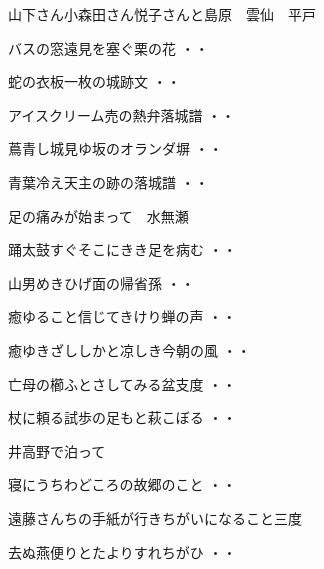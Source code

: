 山下さん小森田さん悦子さんと島原　雲仙　平戸
\begin{shiika}バスの窓遠見を塞ぐ栗の花
\hfill{・・}\end{shiika}
\begin{shiika}蛇の衣板一枚の城跡文
\hfill{・・}\end{shiika}
\begin{shiika}アイスクリーム売の熱弁落城譜
\hfill{・・}\end{shiika}
\begin{shiika}蔦青し城見ゆ坂のオランダ塀
\hfill{・・}\end{shiika}
\begin{shiika}青葉冷え天主の跡の落城譜
\hfill{・・}\end{shiika}
\vspace{ 0.4cm}
足の痛みが始まって　水無瀬
\begin{shiika}踊太鼓すぐそこにきき足を病む
\hfill{・・}\end{shiika}
\begin{shiika}山男めきひげ面の帰省孫
\hfill{・・}\end{shiika}
\begin{shiika}癒ゆること信じてきけり蝉の声
\hfill{・・}\end{shiika}
\begin{shiika}癒ゆきざししかと凉しき今朝の風
\hfill{・・}\end{shiika}
\begin{shiika}亡母の櫛ふとさしてみる盆支度
\hfill{・・}\end{shiika}
\begin{shiika}杖に頼る試歩の足もと萩こぼる
\hfill{・・}\end{shiika}
\vspace{ 0.4cm}
井高野で泊って
\begin{shiika}寝にうちわどころの故郷のこと
\hfill{・・}\end{shiika}
\vspace{ 0.4cm}
遠藤さんちの手紙が行きちがいになること三度
\begin{shiika}去ぬ燕便りとたよりすれちがひ
\hfill{・・}\end{shiika}
